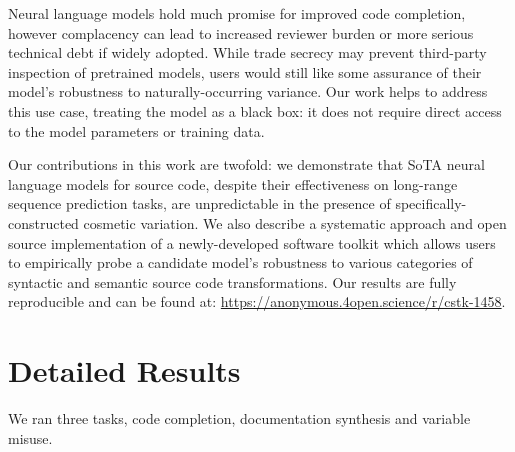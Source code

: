 \documentclass[usenames,dvipsnames]{article} %
\begin{document}
  Neural language models hold much promise for improved code completion, however complacency can lead to increased reviewer burden or more serious technical debt if widely adopted. While trade secrecy may prevent third-party inspection of pretrained models, users would still like some assurance of their model's robustness to naturally-occurring variance. Our work helps to address this use case, treating the model as a black box: it does not require direct access to the model parameters or training data.

  Our contributions in this work are twofold: we demonstrate that SoTA neural language models for source code, despite their effectiveness on long-range sequence prediction tasks, are unpredictable in the presence of specifically-constructed cosmetic variation. We also describe a systematic approach and open source implementation of a newly-developed software toolkit which allows users to empirically probe a candidate model's robustness to various categories of syntactic and semantic source code transformations. Our results are fully reproducible and can be found at: \url{https://anonymous.4open.science/r/cstk-1458}.

  \pagebreak
  
  \pagebreak
  \appendix
  \section{Detailed Results}\label{sec:detailed_results}
  We ran three tasks, code completion, documentation synthesis and variable misuse.
\end{document}
